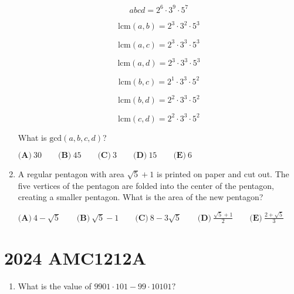 \documentclass{article}
\begin{document}
\begin{enumerate}[label=\arabic*., itemsep=0.5em]
\begin{equation*}
abcd=2^6\cdot 3^9\cdot 5^7
\end{equation*}


\begin{equation*}
\text{lcm}(a,b)=2^3\cdot 3^2\cdot 5^3
\end{equation*}


\begin{equation*}
\text{lcm}(a,c)=2^3\cdot 3^3\cdot 5^3
\end{equation*}


\begin{equation*}
\text{lcm}(a,d)=2^3\cdot 3^3\cdot 5^3
\end{equation*}


\begin{equation*}
\text{lcm}(b,c)=2^1\cdot 3^3\cdot 5^2
\end{equation*}


\begin{equation*}
\text{lcm}(b,d)=2^2\cdot 3^3\cdot 5^2
\end{equation*}


\begin{equation*}
\text{lcm}(c,d)=2^2\cdot 3^3\cdot 5^2
\end{equation*}


What is \(\text{gcd}(a,b,c,d)\)?

\(\textbf{(A)}~30\qquad\textbf{(B)}~45\qquad\textbf{(C)}~3\qquad\textbf{(D)}~15\qquad\textbf{(E)}~6\)\par \vspace{0.5em}\item A regular pentagon with area \(\sqrt{5}+1\) is printed on paper and cut out. The five vertices of the pentagon are folded into the center of the pentagon, creating a smaller pentagon. What is the area of the new pentagon?

\(\textbf{(A)}~4-\sqrt{5}\qquad\textbf{(B)}~\sqrt{5}-1\qquad\textbf{(C)}~8-3\sqrt{5}\qquad\textbf{(D)}~\frac{\sqrt{5}+1}{2}\qquad\textbf{(E)}~\frac{2+\sqrt{5}}{3}\)\par \vspace{0.5em}\end{enumerate}\newpage\section*{2024 AMC1212A}\begin{enumerate}[label=\arabic*., itemsep=0.5em]\item What is the value of \(9901\cdot101-99\cdot10101?\)


\end{enumerate}
\end{document}
